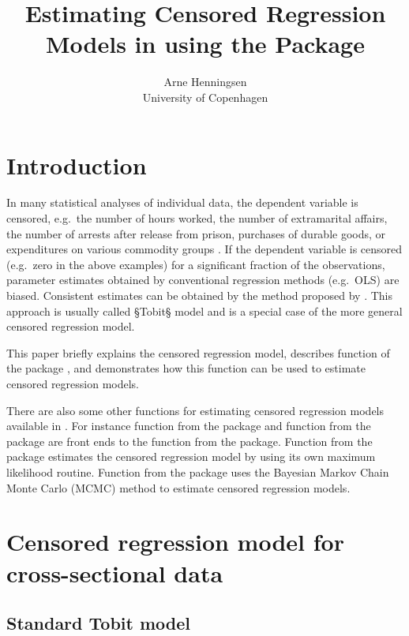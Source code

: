 \documentclass[article,nojss]{jss}
\author{Arne Henningsen\\University of Copenhagen}
\title{Estimating Censored Regression Models in \proglang{R} using the \pkg{sampleSelection} Package}
\begin{document}


\section{Introduction}
\label{sec:intro}

In many statistical analyses of individual data,
the dependent variable is censored,
e.g.\ the number of hours worked,
the number of extramarital affairs,
the number of arrests after release from prison,
purchases of durable goods,
or expenditures on various commodity groups
\citep[p.~869]{greene08}.
If the dependent variable is censored (e.g.\ zero in the above examples)
for a significant fraction of the observations,
parameter estimates obtained by conventional regression methods (e.g.\ OLS)
are biased.
Consistent estimates can be obtained by the method
proposed by \citet{tobin58}.
This approach is usually called §Tobit§ model
and is a special case of the more general censored regression model.

This paper briefly explains the censored regression model,
describes function  of the  package
,
and demonstrates how this function can be used
to estimate censored regression models.

There are also some other functions for estimating censored regression models
available in .
For instance function  from the  package
\citep{kleiber08a,r-aer-1.1}
and function  from the  package
are front ends to the  function from the  package.
Function  from the  package
estimates the censored regression model
by using its own maximum likelihood routine.
Function  from the  package
uses the Bayesian Markov Chain Monte Carlo (MCMC) method
to estimate censored regression models.


\section{Censored regression model for cross-sectional data}
\label{sec:censored}


\subsection{Standard Tobit model}
\end{document}
